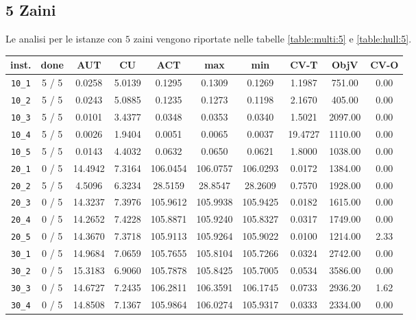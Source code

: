 \subsection{5 Zaini}

Le analisi per le istanze con $5$ zaini vengono riportate nelle tabelle
\ref{table:multi:5} e \ref{table:hull:5}.

\begin{table}[h!]
\begin{center}
\small
\begin{tabular}{| c | c | c | c | c | c | c | c | c | c |}
\hline
inst. & done & AUT & CU & ACT & max & min & CV-T & ObjV & CV-O \\
\hline
\verb|10_1| & 5 / 5 & 0.0258 & 5.0139 & 0.1295 & 0.1309 & 0.1269 & 1.1987 & 751.00 & 0.00\\ 
\verb|10_2| & 5 / 5 & 0.0243 & 5.0885 & 0.1235 & 0.1273 & 0.1198 & 2.1670 & 405.00 & 0.00\\ 
\verb|10_3| & 5 / 5 & 0.0101 & 3.4377 & 0.0348 & 0.0353 & 0.0340 & 1.5021 & 2097.00 & 0.00\\ 
\verb|10_4| & 5 / 5 & 0.0026 & 1.9404 & 0.0051 & 0.0065 & 0.0037 & 19.4727 & 1110.00 & 0.00\\ 
\verb|10_5| & 5 / 5 & 0.0143 & 4.4032 & 0.0632 & 0.0650 & 0.0621 & 1.8000 & 1038.00 & 0.00\\ 
\verb|20_1| & 0 / 5 & 14.4942 & 7.3164 & 106.0454 & 106.0757 & 106.0293 & 0.0172 & 1384.00 & 0.00\\ 
\verb|20_2| & 5 / 5 & 4.5096 & 6.3234 & 28.5159 & 28.8547 & 28.2609 & 0.7570 & 1928.00 & 0.00\\ 
\verb|20_3| & 0 / 5 & 14.3237 & 7.3976 & 105.9612 & 105.9938 & 105.9425 & 0.0182 & 1615.00 & 0.00\\ 
\verb|20_4| & 0 / 5 & 14.2652 & 7.4228 & 105.8871 & 105.9240 & 105.8327 & 0.0317 & 1749.00 & 0.00\\ 
\verb|20_5| & 0 / 5 & 14.3670 & 7.3718 & 105.9113 & 105.9264 & 105.9022 & 0.0100 & 1214.00 & 2.33\\ 
\verb|30_1| & 0 / 5 & 14.9684 & 7.0659 & 105.7655 & 105.8104 & 105.7266 & 0.0324 & 2742.00 & 0.00\\ 
\verb|30_2| & 0 / 5 & 15.3183 & 6.9060 & 105.7878 & 105.8425 & 105.7005 & 0.0534 & 3586.00 & 0.00\\ 
\verb|30_3| & 0 / 5 & 14.6727 & 7.2435 & 106.2811 & 106.3591 & 106.1745 & 0.0733 & 2936.20 & 1.62\\ 
\verb|30_4| & 0 / 5 & 14.8508 & 7.1367 & 105.9864 & 106.0274 & 105.9317 & 0.0333 & 2334.00 & 0.00\\ 

\end{tabular}
\end{center}
\end{table}
